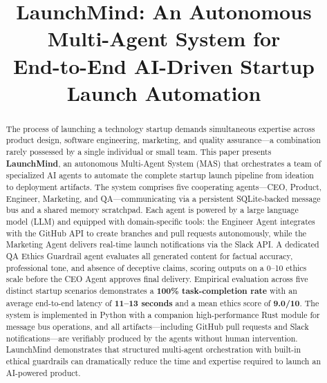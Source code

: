 \documentclass[conference]{IEEEtran}
\begin{document}
\title{LaunchMind: An Autonomous Multi-Agent System for\\
End-to-End AI-Driven Startup Launch Automation}

\author{
}

\maketitle

\begin{abstract}
The process of launching a technology startup demands simultaneous expertise across product design, software engineering, marketing, and quality assurance—a combination rarely possessed by a single individual or small team. This paper presents \textbf{LaunchMind}, an autonomous Multi-Agent System (MAS) that orchestrates a team of specialized AI agents to automate the complete startup launch pipeline from ideation to deployment artifacts. The system comprises five cooperating agents—CEO, Product, Engineer, Marketing, and QA—communicating via a persistent SQLite-backed message bus and a shared memory scratchpad. Each agent is powered by a large language model (LLM) and equipped with domain-specific tools: the Engineer Agent integrates with the GitHub API to create branches and pull requests autonomously, while the Marketing Agent delivers real-time launch notifications via the Slack API. A dedicated QA Ethics Guardrail agent evaluates all generated content for factual accuracy, professional tone, and absence of deceptive claims, scoring outputs on a 0--10 ethics scale before the CEO Agent approves final delivery. Empirical evaluation across five distinct startup scenarios demonstrates a \textbf{100\% task-completion rate} with an average end-to-end latency of \textbf{11--13 seconds} and a mean ethics score of \textbf{9.0/10}. The system is implemented in Python with a companion high-performance Rust module for message bus operations, and all artifacts—including GitHub pull requests and Slack notifications—are verifiably produced by the agents without human intervention. LaunchMind demonstrates that structured multi-agent orchestration with built-in ethical guardrails can dramatically reduce the time and expertise required to launch an AI-powered product.
\end{abstract}
\end{document}
